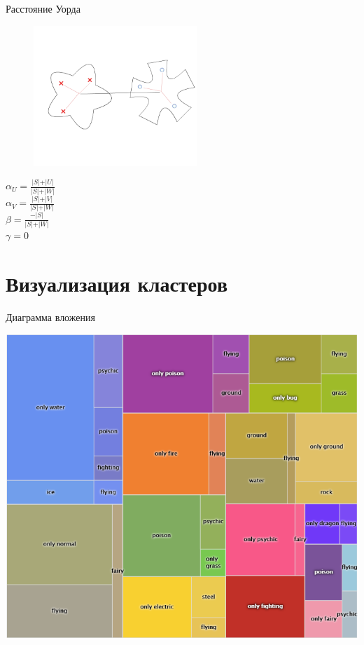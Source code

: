 \documentclass[10pt]{beamer}
\begin{document}
\begin{frame}{Расстояние Уорда}
	\begin{figure}[htbp]
	  \includegraphics[height=150pt, keepaspectratio = true]{images/lans4}  
	\end{figure}

  ${\alpha_U = \frac{\vert S \vert + \vert U \vert}{\vert S \vert + \vert W \vert}}$\\${\alpha_V = \frac{\vert S \vert + \vert V \vert}{\vert S \vert + \vert W \vert}}$ \\${\beta = \frac{ -\vert S \vert}{\vert S \vert + \vert W \vert}}$ \\${\gamma = 0}$
\end{frame}

\section{Визуализация кластеров}

{
\begin{frame}{Диаграмма вложения}
  \begin{center}
    \includegraphics[height=0.8 \textheight, keepaspectratio = true]{images/diagram}    
  \end{center}
\end{frame}
}
\end{document}
